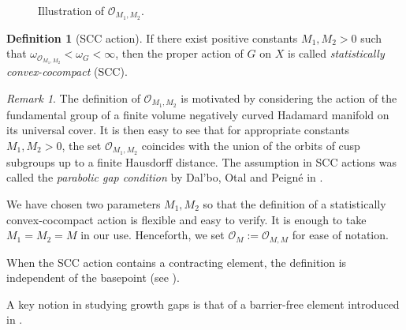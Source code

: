 \documentclass{amsart}
\theoremstyle{definition}
\newtheorem{defn}[thm]{Definition}
\theoremstyle{remark}
\newtheorem*{rem}{Remark}
\newcommand{\U}{ X}
\newcommand{\e}[1]{\omega_{#1}}
\begin{document}
\begin{figure}[h]
    \caption{Illustration of $\mathcal O_{M_1,M_2}$.}
    \label{fig:enter-label}
\end{figure}

\begin{defn}[SCC action]\label{SCCDefn}
If there exist positive constants $M_1,M_2>0$ such that $\e {\mathcal{O}_{M_1,M_2}}<\e G<\infty$, then the proper action of $G$ on $\U$ is called \textit{statistically convex-cocompact} (SCC).
\end{defn}
\begin{rem}
The  definition of  $\mathcal{O}_{M_1,M_2}$ is motivated by considering  the action of  the fundamental group of a finite volume negatively curved Hadamard manifold on its universal cover. It is then easy to see that for appropriate constants $M_1, M_2>0$, the set $\mathcal{O}_{M_1,M_2}$ coincides with  the union of the orbits of cusp subgroups up to a  finite Hausdorff distance. The assumption in SCC actions was called the \textit{parabolic gap condition} by Dal'bo, Otal and Peign\'{e} in \cite{DOP}.  
\end{rem}
We have chosen two parameters $M_1,M_2$ so that the definition of a statistically convex-cocompact action  is flexible and easy to verify. It is enough to take $M_1=M_2=M$ in our use. Henceforth, we set $\mathcal{O}_M:=\mathcal{O}_{M,M}$ for ease of notation.

 
When the SCC action contains a contracting element, the definition is independent of the basepoint (see \cite[Lemma 6.2]{YANG10}).

A key notion in studying growth gaps is that of a barrier-free element introduced in \cite{YANG10}.
\end{document}
